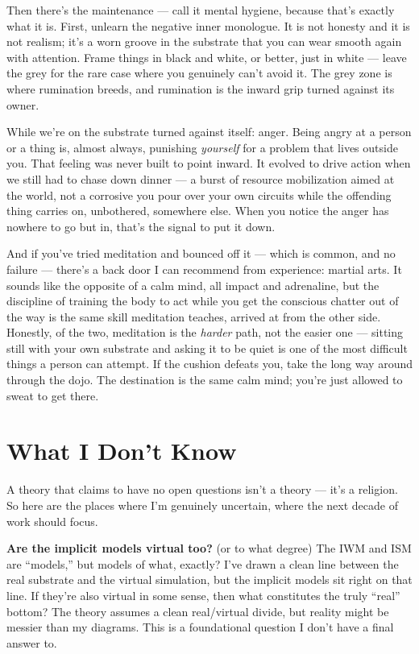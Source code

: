 \documentclass[11pt, twoside, openright]{book}
\begin{document}
Then there's the maintenance --- call it mental hygiene, because that's exactly what it is. First, unlearn the negative inner monologue. It is not honesty and it is not realism; it's a worn groove in the substrate that you can wear smooth again with attention. Frame things in black and white, or better, just in white --- leave the grey for the rare case where you genuinely can't avoid it. The grey zone is where rumination breeds, and rumination is the inward grip turned against its owner.

While we're on the substrate turned against itself: anger. Being angry at a person or a thing is, almost always, punishing \textit{yourself} for a problem that lives outside you. That feeling was never built to point inward. It evolved to drive action when we still had to chase down dinner --- a burst of resource mobilization aimed at the world, not a corrosive you pour over your own circuits while the offending thing carries on, unbothered, somewhere else. When you notice the anger has nowhere to go but in, that's the signal to put it down.

And if you've tried meditation and bounced off it --- which is common, and no failure --- there's a back door I can recommend from experience: martial arts. It sounds like the opposite of a calm mind, all impact and adrenaline, but the discipline of training the body to act while you get the conscious chatter out of the way is the same skill meditation teaches, arrived at from the other side. Honestly, of the two, meditation is the \textit{harder} path, not the easier one --- sitting still with your own substrate and asking it to be quiet is one of the most difficult things a person can attempt. If the cushion defeats you, take the long way around through the dojo. The destination is the same calm mind; you're just allowed to sweat to get there.

\section*{What I Don't Know}

A theory that claims to have no open questions isn't a theory --- it's a religion. So here are the places where I'm genuinely uncertain, where the next decade of work should focus.

\textbf{Are the implicit models virtual too?} (or to what degree) The IWM and ISM are ``models,'' but models of what, exactly? I've drawn a clean line between the real substrate and the virtual simulation, but the implicit models sit right on that line. If they're also virtual in some sense, then what constitutes the truly ``real'' bottom? The theory assumes a clean real/virtual divide, but reality might be messier than my diagrams. This is a foundational question I don't have a final answer to.
\end{document}
